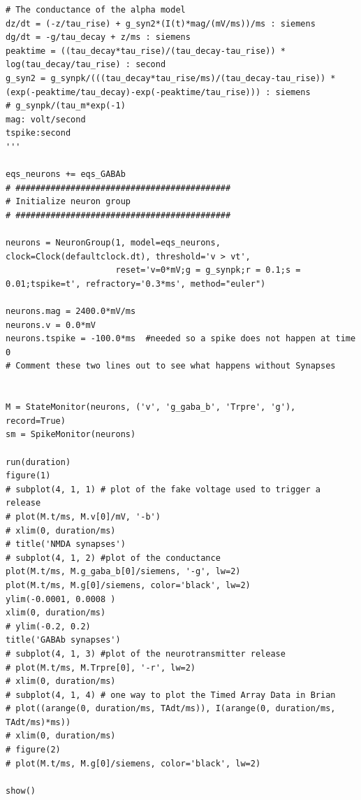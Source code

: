 \documentclass[12pt]{article}
\begin{document}
\begin{lstlisting}
# The conductance of the alpha model
dz/dt = (-z/tau_rise) + g_syn2*(I(t)*mag/(mV/ms))/ms : siemens
dg/dt = -g/tau_decay + z/ms : siemens
peaktime = ((tau_decay*tau_rise)/(tau_decay-tau_rise)) * log(tau_decay/tau_rise) : second
g_syn2 = g_synpk/(((tau_decay*tau_rise/ms)/(tau_decay-tau_rise)) * (exp(-peaktime/tau_decay)-exp(-peaktime/tau_rise))) : siemens
# g_synpk/(tau_m*exp(-1)
mag: volt/second
tspike:second
'''

eqs_neurons += eqs_GABAb
# ###########################################
# Initialize neuron group
# ###########################################

neurons = NeuronGroup(1, model=eqs_neurons, clock=Clock(defaultclock.dt), threshold='v > vt',
                      reset='v=0*mV;g = g_synpk;r = 0.1;s = 0.01;tspike=t', refractory='0.3*ms', method="euler")

neurons.mag = 2400.0*mV/ms
neurons.v = 0.0*mV
neurons.tspike = -100.0*ms  #needed so a spike does not happen at time 0
# Comment these two lines out to see what happens without Synapses


M = StateMonitor(neurons, ('v', 'g_gaba_b', 'Trpre', 'g'), record=True)
sm = SpikeMonitor(neurons)

run(duration)
figure(1)
# subplot(4, 1, 1) # plot of the fake voltage used to trigger a release
# plot(M.t/ms, M.v[0]/mV, '-b')
# xlim(0, duration/ms)
# title('NMDA synapses')
# subplot(4, 1, 2) #plot of the conductance
plot(M.t/ms, M.g_gaba_b[0]/siemens, '-g', lw=2)
plot(M.t/ms, M.g[0]/siemens, color='black', lw=2)
ylim(-0.0001, 0.0008 )
xlim(0, duration/ms)
# ylim(-0.2, 0.2)
title('GABAb synapses')
# subplot(4, 1, 3) #plot of the neurotransmitter release
# plot(M.t/ms, M.Trpre[0], '-r', lw=2)
# xlim(0, duration/ms)
# subplot(4, 1, 4) # one way to plot the Timed Array Data in Brian
# plot((arange(0, duration/ms, TAdt/ms)), I(arange(0, duration/ms, TAdt/ms)*ms))
# xlim(0, duration/ms)
# figure(2)
# plot(M.t/ms, M.g[0]/siemens, color='black', lw=2)

show()
\end{lstlisting}
\end{document}

